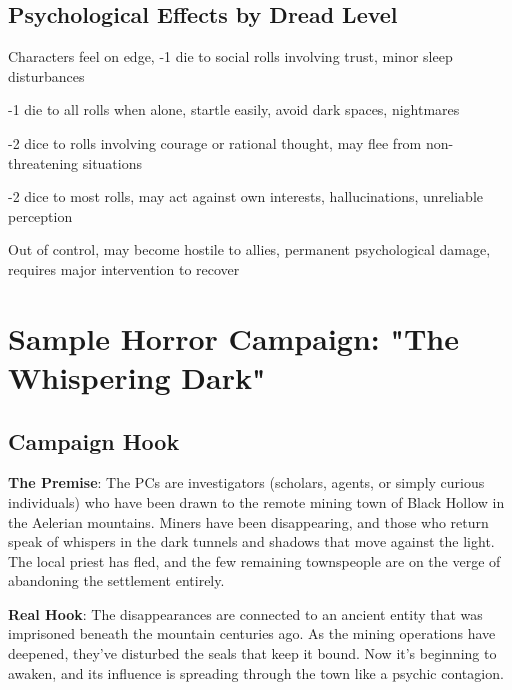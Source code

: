 \documentclass[11pt]{article}
\begin{document}
\subsection*{Psychological Effects by Dread Level}

\begin{description}[leftmargin=*]
\item[0-2 Segments - Unease] Characters feel on edge, -1 die to social rolls involving trust, minor sleep disturbances
\item[3-4 Segments - Fear] -1 die to all rolls when alone, startle easily, avoid dark spaces, nightmares
\item[5-6 Segments - Terror] -2 dice to rolls involving courage or rational thought, may flee from non-threatening situations
\item[7-8 Segments - Madness] -2 dice to most rolls, may act against own interests, hallucinations, unreliable perception
\item[9-10 Segments - Broken] Out of control, may become hostile to allies, permanent psychological damage, requires major intervention to recover
\end{description}

\section*{Sample Horror Campaign: "The Whispering Dark"}

\subsection*{Campaign Hook}

\begin{mdframed}[backgroundcolor=horrorbg]
\textbf{The Premise}: The PCs are investigators (scholars, agents, or simply curious individuals) who have been drawn to the remote mining town of Black Hollow in the Aelerian mountains. Miners have been disappearing, and those who return speak of whispers in the dark tunnels and shadows that move against the light. The local priest has fled, and the few remaining townspeople are on the verge of abandoning the settlement entirely.

\textbf{Real Hook}: The disappearances are connected to an ancient entity that was imprisoned beneath the mountain centuries ago. As the mining operations have deepened, they've disturbed the seals that keep it bound. Now it's beginning to awaken, and its influence is spreading through the town like a psychic contagion.
\end{mdframed}
\end{document}
